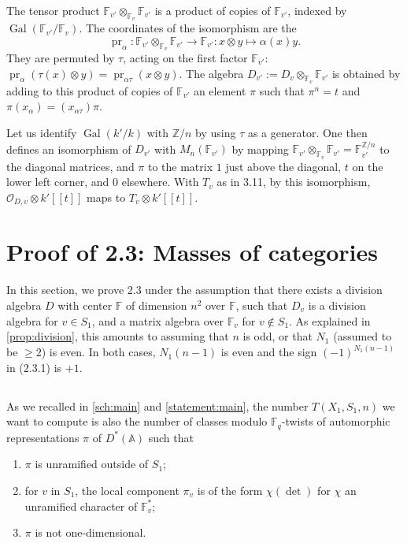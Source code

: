 \documentclass[11pt,a4paper]{article}
\theoremstyle{plain}
\theoremstyle{definition}
\DeclareMathOperator{\Gal}{Gal}
\DeclareMathOperator{\pr}{pr}
\newcommand{\Fq}{\mathbb{F}_q}
\newcommand{\Z}{\mathbb{Z}}
\begin{document}
The tensor product $\mathbb{F}_{v'} \otimes_{\mathbb{F}_v} \mathbb{F}_{v'}$ is a product of copies of $\mathbb{F}_{v'}$, indexed by $\Gal(\mathbb{F}_{v'}/\mathbb{F}_v)$. The coordinates of the isomorphism are the
\[
\pr_\alpha: \mathbb{F}_{v'} \otimes_{\mathbb{F}_v} \mathbb{F}_{v'} \to \mathbb{F}_{v'}: x \otimes y \mapsto \alpha(x)y.
\]
They are permuted by $\tau$, acting on the first factor $\mathbb{F}_{v'}$: $\pr_\alpha(\tau(x) \otimes y) = \pr_{\alpha\tau}(x \otimes y)$. The algebra $D_{v'} := D_v \otimes_{\mathbb{F}_v} \mathbb{F}_{v'}$ is obtained by adding to this product of copies of $\mathbb{F}_{v'}$ an element $\pi$ such that $\pi^n = t$ and $\pi(x_\alpha) = (x_{\alpha\tau}) \pi$.

Let us identify $\Gal(k'/k)$ with $\Z/n$ by using $\tau$ as a generator. One then defines an isomorphism of $D_{v'}$ with $M_n(\mathbb{F}_{v'})$ by mapping $\mathbb{F}_{v'} \otimes_{\mathbb{F}_v} \mathbb{F}_{v'} = \mathbb{F}_{v'}^{\Z/n}$ to the diagonal matrices, and $\pi$ to the matrix $1$ just above the diagonal, $t$ on the lower left corner, and $0$ elsewhere. With $T_v$ as in 3.11, by this isomorphism, $\mathcal{O}_{D,v} \otimes k'[[t]]$ maps to $T_v \otimes k'[[t]]$.

\section{Proof of 2.3: Masses of categories}

In this section, we prove 2.3 under the assumption that there exists a division algebra $D$ with center $\mathbb{F}$ of dimension $n^2$ over $\mathbb{F}$, such that $D_v$ is a division algebra for $v \in S_1$, and a matrix algebra over $\mathbb{F}_v$ for $v \notin S_1$. As explained in \ref{prop:division}, this amounts to assuming that $n$ is odd, or that $N_1$ (assumed to be $\geq 2$) is even. In both cases, $N_1(n-1)$ is even and the sign $(-1)^{N_1(n-1)}$ in (2.3.1) is $+1$.

\subsection{}
As we recalled in \ref{sch:main} and \ref{statement:main}, the number $T(X_1,S_1,n)$ we want to compute is also the number of classes modulo $\Fq$-twists of automorphic representations $\pi$ of $D^*(\mathbb{A})$ such that
\begin{enumerate}
\item[(i)] $\pi$ is unramified outside of $S_1$;
\item[(ii)] for $v$ in $S_1$, the local component $\pi_v$ is of the form $\chi(\det)$ for $\chi$ an unramified character of $\mathbb{F}_v^*$;
\item[(iii)] $\pi$ is not one-dimensional.
\end{enumerate}
\end{document}
